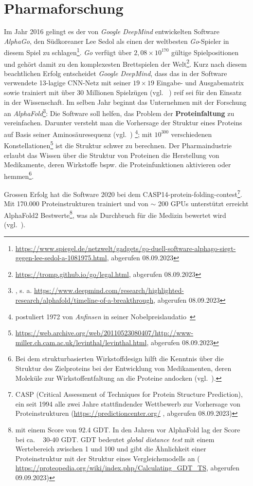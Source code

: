 \section{Pharmaforschung}
Im Jahr 2016 gelingt es der von \textit{Google DeepMind} entwickelten Software \textit{AlphaGo}, den Südkoreaner Lee Sedol als einen der weltbesten \textit{Go}-Spieler in diesem Spiel zu schlagen\footnote{
    \url{https://www.spiegel.de/netzwelt/gadgets/go-duell-software-alphago-siegt-gegen-lee-sedol-a-1081975.html}, abgerufen 08.09.2023
}. \textit{Go} verfügt über $2,08 \times 10^{170}$ gültige Spielpositionen und gehört damit zu den komplexesten Brettspielen der Welt\footnote{
    \url{https://tromp.github.io/go/legal.html}, abgerufen 08.09.2023
}. Kurz nach diesem beachtlichen Erfolg entscheidet \textit{Google DeepMind}, dass das in der Software verwendete 13-lagige CNN-Netz mit seiner $19 \times 19$ Eingabe- und Ausgabematrix sowie trainiert mit über 30 Millionen Spielzügen (vgl. ~\cite[371]{Ert21c}) reif sei für den Einsatz in der Wissenschaft. Im selben Jahr beginnt das Unternehmen mit der Forschung an \textit{AlphaFold}\footnote{
    \cite{JEP+21}, s. a. \url{https://www.deepmind.com/research/highlighted-research/alphafold/timeline-of-a-breakthrough}, abgerufen 08.09.2023
}: Die Software soll helfen, das Problem der \textbf{Proteinfaltung} zu vereinfachen. Darunter versteht man die Vorhersage der Struktur eines Proteins auf Basis seiner Aminosäuresequenz (vgl.~\cite{DOSW08}) \footnote{
    postuliert 1972 von \textit{Anfinsen} in seiner Nobelpreislaudatio~\cite[223]{Anf73}
}; mit $10^{300}$ verschiedenen Konstellationen\footnote{
    \url{https://web.archive.org/web/20110523080407/http://www-miller.ch.cam.ac.uk/levinthal/levinthal.html}, abgerufen 08.09.2023
} ist die Struktur schwer zu berechnen. Der Pharmaindustrie erlaubt das Wissen über die Struktur von Proteinen die Herstellung von Medikamente, deren Wirkstoffe bspw. die Proteinfunktionen aktivieren oder hemmen\footnote{
    Bei dem strukturbasierten Wirkstoffdesign hilft die Kenntnis über die Struktur des Zielproteins bei der Entwicklung von Medikamenten, deren Moleküle zur Wirkstoffentfaltung an die Proteine andocken (vgl.~\cite[29 ff.]{SKM10}).
}.

Grossen Erfolg hat die Software 2020 bei dem CASP14-protein-folding-contest\footnote{
    CASP (Critical Assessment of Techniques for Protein Structure Prediction), ein seit 1994 alle zwei Jahre stattfindender Wettbewerb zur Vorhersage von Proteinstrukturen (\url{https://predictioncenter.org/} , abgerufen 08.09.2023)
}. Mit 170.000 Proteinstrukturen trainiert und von $\sim$ 200 GPUs unterstützt erreicht AlphaFold2 Bestwerte\footnote{
    mit einem Score von 92.4 GDT. In den Jahren vor AlphaFold lag der Score bei ca. ~ 30-40 GDT. GDT bedeutet \textit{global distance test} mit einem Wertebereich zwischen 1 und 100 und gibt die Ähnlichkeit einer Proteinstruktur mit der Struktur eines Vergleichsmodells an (
    \url{https://proteopedia.org/wiki/index.php/Calculating_GDT_TS}, abgerufen 09.09.2023)
}, was als Durchbruch für die Medizin bewertet wird (vgl.~\cite[204]{Cal20}).


